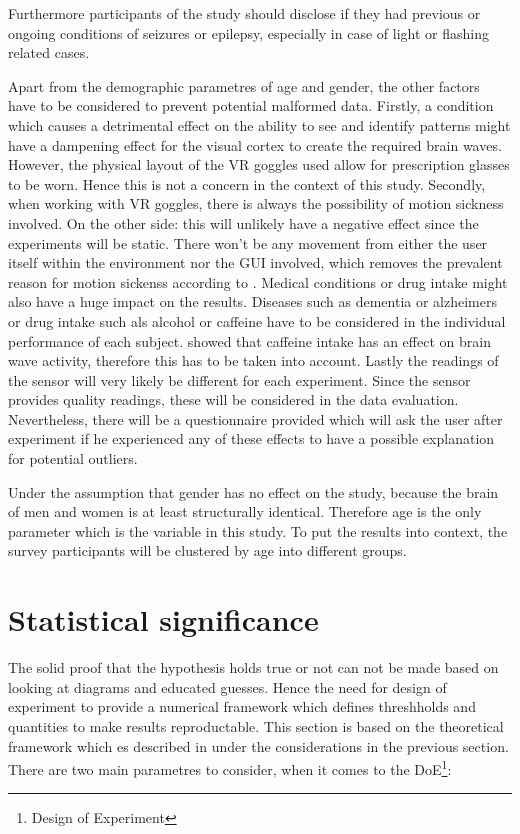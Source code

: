             Furthermore participants of the study should disclose if they had previous or ongoing conditions of seizures or epilepsy, especially in case of light or flashing related cases.

            Apart from the demographic parametres of age and gender, the other factors have to be considered to prevent potential malformed data. Firstly, a condition which causes a detrimental effect on the ability to see and identify patterns might have a dampening effect for the visual cortex to create the required brain waves. However, the physical layout of the VR goggles used allow for prescription glasses to be worn. Hence this is not a concern in the context of this study. Secondly, when working with VR goggles, there is always the possibility of motion sickness involved. On the other side: this will unlikely have a negative effect since the experiments will be static. There won't be any movement from either the user itself within the environment nor the GUI involved, which removes the prevalent reason for motion sickenss according to \cite{Golding.2006}.
            Medical conditions or drug intake might also have a huge impact on the results. Diseases such as dementia or alzheimers or drug intake such als alcohol or caffeine have to be considered in the individual performance of each subject. \cite{Kenemans.1995} showed that caffeine intake has an effect on brain wave activity, therefore this has to be taken into account.
            Lastly the readings of the sensor will very likely be different for each experiment. Since the sensor provides quality readings, these will be considered in the data evaluation. Nevertheless, there will be a questionnaire provided which will ask the user after experiment if he experienced any of these effects to have a possible explanation for potential outliers.

            \medskip

            Under the assumption that gender has no effect on the study, because the brain of men and women is at least structurally identical. Therefore age is the only parameter which is the variable in this study. To put the results into context, the survey participants will be clustered by age into different groups.

        \section{Statistical significance}\label{doe}

            The solid proof that the hypothesis holds true or not can not be made based on looking at diagrams and educated guesses. Hence the need for design of experiment to provide a numerical framework which defines threshholds and quantities to make results reproductable. This section is based on the theoretical framework which es described in \cite[87ff]{Siebertz.2017} under the considerations in the previous section.
            There are two main parametres to consider, when it comes to the DoE\footnote{Design of Experiment}: 
            

